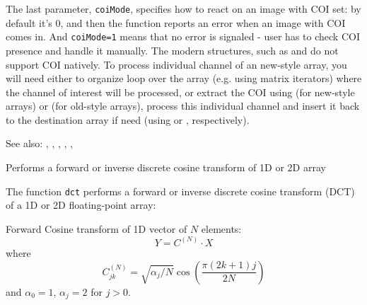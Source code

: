 The last parameter, \texttt{coiMode}, specifies how to react on an image with COI set: by default it's 0, and then the function reports an error when an image with COI comes in. And \texttt{coiMode=1} means that no error is signaled - user has to check COI presence and handle it manually. The modern structures, such as  and  do not support COI natively. To process individual channel of an new-style array, you will need either to organize loop over the array (e.g. using matrix iterators) where the channel of interest will be processed, or extract the COI using  (for new-style arrays) or  (for old-style arrays), process this individual channel and insert it back to the destination array if need (using  or , respectively).

See also: , , , , , 


Performs a forward or inverse discrete cosine transform of 1D or 2D array

\begin{description}
\end{description}

The function \texttt{dct} performs a forward or inverse discrete cosine transform (DCT) of a 1D or 2D floating-point array:

Forward Cosine transform of 1D vector of $N$ elements:
\[Y = C^{(N)} \cdot X\]
where
\[C^{(N)}_{jk}=\sqrt{\alpha_j/N}\cos\left(\frac{\pi(2k+1)j}{2N}\right)\]
and $\alpha_0=1$, $\alpha_j=2$ for $j > 0$.

